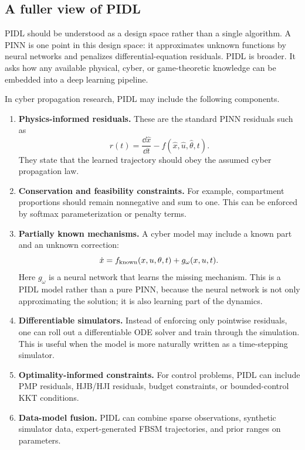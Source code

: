 \documentclass[11pt,a4paper]{article}
\begin{document}
\subsection{A fuller view of PIDL}
PIDL should be understood as a design space rather than a single algorithm. A PINN is one point in this design space: it approximates unknown functions by neural networks and penalizes differential-equation residuals. PIDL is broader. It asks how any available physical, cyber, or game-theoretic knowledge can be embedded into a deep learning pipeline.

In cyber propagation research, PIDL may include the following components.
\begin{enumerate}[leftmargin=2em]
    \item \textbf{Physics-informed residuals.} These are the standard PINN residuals such as
    \begin{equation}
        r(t)=\frac{\dd \hat{x}}{\dd t}-f(\hat{x},\hat{u},\hat{\theta},t).
    \end{equation}
    They state that the learned trajectory should obey the assumed cyber propagation law.
    \item \textbf{Conservation and feasibility constraints.} For example, compartment proportions should remain nonnegative and sum to one. This can be enforced by softmax parameterization or penalty terms.
    \item \textbf{Partially known mechanisms.} A cyber model may include a known part and an unknown correction:
    \begin{equation}
        \dot{x}=f_{\rm known}(x,u,\theta,t)+g_{\omega}(x,u,t).
    \end{equation}
    Here $g_{\omega}$ is a neural network that learns the missing mechanism. This is a PIDL model rather than a pure PINN, because the neural network is not only approximating the solution; it is also learning part of the dynamics.
    \item \textbf{Differentiable simulators.} Instead of enforcing only pointwise residuals, one can roll out a differentiable ODE solver and train through the simulation. This is useful when the model is more naturally written as a time-stepping simulator.
    \item \textbf{Optimality-informed constraints.} For control problems, PIDL can include PMP residuals, HJB/HJI residuals, budget constraints, or bounded-control KKT conditions.
    \item \textbf{Data-model fusion.} PIDL can combine sparse observations, synthetic simulator data, expert-generated FBSM trajectories, and prior ranges on parameters.
\end{enumerate}
\end{document}
